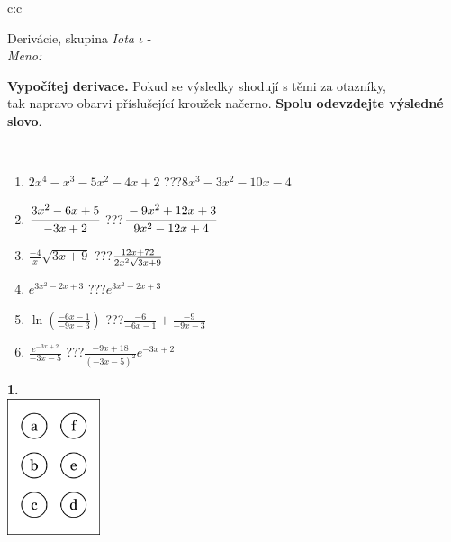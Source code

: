 \documentclass[10pt]{report}
\begin{document}
\begin{tabular}{c:c}
\begin{minipage}[c][104.5mm][t]{0.5\linewidth}
\begin{center}
\vspace{7mm}
{\huge Derivácie, skupina \textit{Iota $\iota$} -}\\[5mm]
\textit{Meno:}\phantom{xxxxxxxxxxxxxxxxxxxxxxxxxxxxxxxxxxxxxxxxxxxxxxxxxxxxxxxxxxxxxxxxx}\\[5mm]
\begin{minipage}{0.95\linewidth}
\begin{center}
\textbf{Vypočítej derivace.} Pokud se výsledky shodují s těmi za otazníky,\\tak napravo obarvi příslušející kroužek načerno. \textbf{Spolu odevzdejte výsledné slovo}.
\end{center}
\end{minipage}
\\[1mm]
\begin{minipage}{0.79\linewidth}
\begin{center}
\begin{varwidth}{\linewidth}
\begin{enumerate}
\normalsize
\item $2x^4-x^3-5x^2-4x+2$\quad \dotfill\; ???\;\dotfill \quad $8x^3-3x^2-10x-4$
\item $\cfrac{3x^2-6x+5}{-3x+2}$\quad \dotfill\; ???\;\dotfill \quad $\cfrac{-9x^2+12x+3}{9x^2-12x+4}$
\item $\frac{-4}{x}\sqrt{3x+9}$\quad \dotfill\; ???\;\dotfill \quad $\frac{12x+72}{2x^2 \sqrt{\smash[b]{3x+9}}}$
\item $e^{3x^2-2x+3}$\quad \dotfill\; ???\;\dotfill \quad $e^{3x^2-2x+3}$
\item $\ln{\left(\frac{-6x-1}{-9x-3}\right)}$\quad \dotfill\; ???\;\dotfill \quad $\frac{-6}{-6x-1}+\frac{-9}{-9x-3}$
\item $\frac{e^{-3x+2}}{-3x-5}$\quad \dotfill\; ???\;\dotfill \quad $\frac{-9x+18}{(-3x-5)^2}e^{-3x+2}$
\end{enumerate}
\end{varwidth}
\end{center}
\end{minipage}
\begin{minipage}{0.20\linewidth}
\begin{center}
{\Huge\bfseries 1.} \\[2mm]
\includegraphics[height=40mm]{../images/braille.png}

\end{center}
\end{minipage}
\end{center}
\end{minipage}
\end{tabular}
\end{document}

